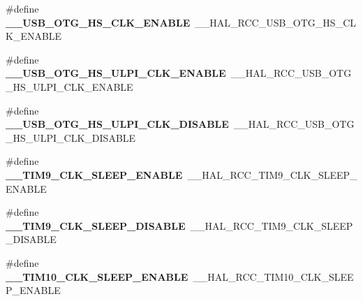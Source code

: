 \begin{DoxyCompactItemize}
\item 
\#define {\bfseries \+\_\+\+\_\+\+U\+S\+B\+\_\+\+O\+T\+G\+\_\+\+H\+S\+\_\+\+C\+L\+K\+\_\+\+E\+N\+A\+B\+LE}~\+\_\+\+\_\+\+H\+A\+L\+\_\+\+R\+C\+C\+\_\+\+U\+S\+B\+\_\+\+O\+T\+G\+\_\+\+H\+S\+\_\+\+C\+L\+K\+\_\+\+E\+N\+A\+B\+LE\hypertarget{group___h_a_l___r_c_c___aliased_gabb3e2e415cffa49ad11304197a87c815}{}\label{group___h_a_l___r_c_c___aliased_gabb3e2e415cffa49ad11304197a87c815}

\item 
\#define {\bfseries \+\_\+\+\_\+\+U\+S\+B\+\_\+\+O\+T\+G\+\_\+\+H\+S\+\_\+\+U\+L\+P\+I\+\_\+\+C\+L\+K\+\_\+\+E\+N\+A\+B\+LE}~\+\_\+\+\_\+\+H\+A\+L\+\_\+\+R\+C\+C\+\_\+\+U\+S\+B\+\_\+\+O\+T\+G\+\_\+\+H\+S\+\_\+\+U\+L\+P\+I\+\_\+\+C\+L\+K\+\_\+\+E\+N\+A\+B\+LE\hypertarget{group___h_a_l___r_c_c___aliased_gacb7cf172f15526f73b2291f9440577d4}{}\label{group___h_a_l___r_c_c___aliased_gacb7cf172f15526f73b2291f9440577d4}

\item 
\#define {\bfseries \+\_\+\+\_\+\+U\+S\+B\+\_\+\+O\+T\+G\+\_\+\+H\+S\+\_\+\+U\+L\+P\+I\+\_\+\+C\+L\+K\+\_\+\+D\+I\+S\+A\+B\+LE}~\+\_\+\+\_\+\+H\+A\+L\+\_\+\+R\+C\+C\+\_\+\+U\+S\+B\+\_\+\+O\+T\+G\+\_\+\+H\+S\+\_\+\+U\+L\+P\+I\+\_\+\+C\+L\+K\+\_\+\+D\+I\+S\+A\+B\+LE\hypertarget{group___h_a_l___r_c_c___aliased_gabc6cd0dc76c5ed13a0e7cba823c13312}{}\label{group___h_a_l___r_c_c___aliased_gabc6cd0dc76c5ed13a0e7cba823c13312}

\item 
\#define {\bfseries \+\_\+\+\_\+\+T\+I\+M9\+\_\+\+C\+L\+K\+\_\+\+S\+L\+E\+E\+P\+\_\+\+E\+N\+A\+B\+LE}~\+\_\+\+\_\+\+H\+A\+L\+\_\+\+R\+C\+C\+\_\+\+T\+I\+M9\+\_\+\+C\+L\+K\+\_\+\+S\+L\+E\+E\+P\+\_\+\+E\+N\+A\+B\+LE\hypertarget{group___h_a_l___r_c_c___aliased_gac9bbf39b89a6473c844e17e11a3eab9f}{}\label{group___h_a_l___r_c_c___aliased_gac9bbf39b89a6473c844e17e11a3eab9f}

\item 
\#define {\bfseries \+\_\+\+\_\+\+T\+I\+M9\+\_\+\+C\+L\+K\+\_\+\+S\+L\+E\+E\+P\+\_\+\+D\+I\+S\+A\+B\+LE}~\+\_\+\+\_\+\+H\+A\+L\+\_\+\+R\+C\+C\+\_\+\+T\+I\+M9\+\_\+\+C\+L\+K\+\_\+\+S\+L\+E\+E\+P\+\_\+\+D\+I\+S\+A\+B\+LE\hypertarget{group___h_a_l___r_c_c___aliased_ga7f52505d183acb87448424209f9399aa}{}\label{group___h_a_l___r_c_c___aliased_ga7f52505d183acb87448424209f9399aa}

\item 
\#define {\bfseries \+\_\+\+\_\+\+T\+I\+M10\+\_\+\+C\+L\+K\+\_\+\+S\+L\+E\+E\+P\+\_\+\+E\+N\+A\+B\+LE}~\+\_\+\+\_\+\+H\+A\+L\+\_\+\+R\+C\+C\+\_\+\+T\+I\+M10\+\_\+\+C\+L\+K\+\_\+\+S\+L\+E\+E\+P\+\_\+\+E\+N\+A\+B\+LE\hypertarget{group___h_a_l___r_c_c___aliased_gaf1904f04654e232acf4caca31f544a33}{}\label{group___h_a_l___r_c_c___aliased_gaf1904f04654e232acf4caca31f544a33}


\end{DoxyCompactItemize}

